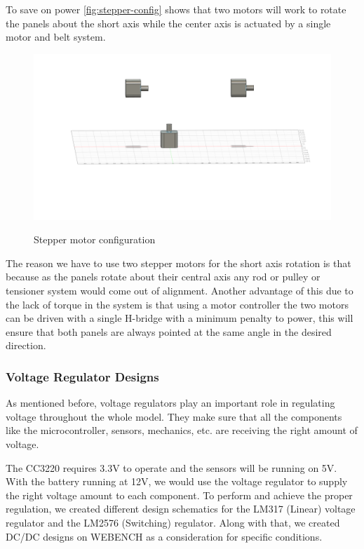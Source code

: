 To save on power \autoref{fig:stepper-config} shows that two motors will work to rotate the panels about the short axis while the center axis is actuated by a single motor and belt system.
\begin{figure}[H]
    \centering
    \caption{Stepper motor configuration}
    \includegraphics[width=\textwidth]{images/stepper-config.png}
    \label{fig:stepper-config}
\end{figure}
The reason we have to use two stepper motors for the short axis rotation is that because as the panels rotate about their central axis any rod or pulley or tensioner system would come out of alignment. Another advantage of this due to the lack of torque in the system is that using a motor controller the two motors can be driven with a single H-bridge with a minimum penalty to power, this will ensure that both panels are always pointed at the same angle in the desired direction.\par
\subsubsection{Voltage Regulator Designs}
As mentioned before, voltage regulators play an important role in regulating voltage throughout the whole model. They make sure that all the components like the microcontroller, sensors, mechanics, etc. are receiving the right amount of voltage.\par
The CC3220 requires 3.3V to operate and the sensors will be running on 5V. With the battery running at 12V, we would use the voltage regulator to supply the right voltage amount to each component. To perform and achieve the proper regulation, we created different design schematics for the LM317 (Linear) voltage regulator and the LM2576 (Switching) regulator. Along with that, we created DC/DC designs on WEBENCH as a consideration for specific conditions.\par
